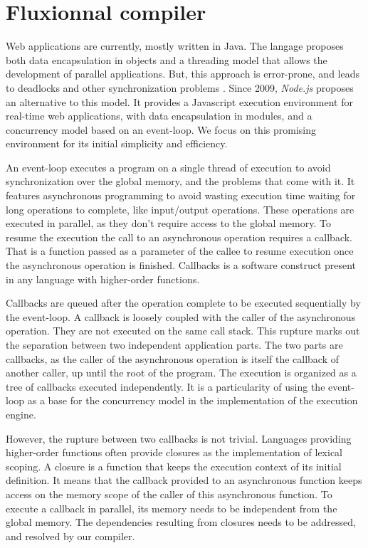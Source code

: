 \section{Fluxionnal compiler} \label{section:compiler}

Web applications are currently, mostly written in Java.
The langage proposes both data encapsulation in objects and a threading model that allows the development of parallel applications.
But, this approach is error-prone, and leads to deadlocks and other synchronization problems \cite{Adya2002}.
Since 2009, \textit{Node.js} proposes an alternative to this model.
It provides a Javascript execution environment for real-time web applications, with data encapsulation in modules, and a concurrency model based on an event-loop.
We focus on this promising environment for its initial simplicity and efficiency.

An event-loop executes a program on a single thread of execution to avoid synchronization over the global memory, and the problems that come with it.
It features asynchronous programming to avoid wasting execution time waiting for long operations to complete, like input/output operations.
These operations are executed in parallel, as they don't require access to the global memory.
To resume the execution the call to an asynchronous operation requires a callback.
That is a function passed as a parameter of the callee to resume execution once the asynchronous operation is finished.
Callbacks is a software construct present in any language with higher-order functions.

Callbacks are queued after the operation complete to be executed sequentially by the event-loop.
A callback is loosely coupled with the caller of the asynchronous operation. They are not executed on the same call stack.
This rupture marks out the separation between two independent application parts.
The two parts are callbacks, as the caller of the asynchronous operation is itself the callback of another caller, up until the root of the program.
The execution is organized as a tree of callbacks executed independently.
It is a particularity of using the event-loop as a base for the concurrency model in the implementation of the execution engine.

However, the rupture between two callbacks is not trivial.
Languages providing higher-order functions often provide closures as the implementation of lexical scoping.
A closure is a function that keeps the execution context of its initial definition.
It means that the callback provided to an asynchronous function keeps access on the memory scope of the caller of this asynchronous function.
To execute a callback in parallel, its memory needs to be independent from the global memory.
The dependencies resulting from closures needs to be addressed, and resolved by our compiler.

